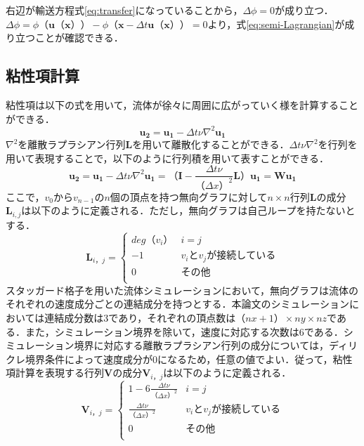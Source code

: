\documentclass[a4j,12pt]{jreport}
\begin{document}
 右辺が輸送方程式\ref{eq:transfer}になっていることから，$ \varDelta \phi =0$が成り立つ．
$\varDelta \phi = \phi（ \bm{u} （\bm{x}）） - \phi （\bm{x} - \varDelta t\bm{u} （\bm{x}））= 0$より，式\ref{eq:semi-Lagrangian}が成り立つことが確認できる．
\subsection{粘性項計算}
粘性項は以下の式を用いて，流体が徐々に周囲に広がっていく様を計算することができる．
\[
\bm{u_2}   =  \bm{u_1} - \varDelta t \nu\nabla^2\bm{u_1}
\]
$\nabla^2$を離散ラプラシアン行列$\mathbf{L}$を用いて離散化することができる．$\varDelta t \nu\nabla^2$を行列を用いて表現することで，以下のように行列積を用いて表すことができる．
\begin{equation}\label{eq:discrete Laplacian}
	\bm{u_2}   =  \bm{u_1} - \varDelta t \nu\nabla^2\bm{u_1} = （\mathbf{I} -  \frac{\varDelta t \nu}{（\varDelta x）^2}\mathbf{L}）\bm{u_1} = \mathbf{W}\bm{u_1}
\end{equation}
ここで，$v_0$から$v_{n-1}$の$n$個の頂点を持つ無向グラフに対して$n \times n$行列$\mathbf{L}$の成分$\mathbf{L}_{i,j}$は以下のように定義される．ただし，無向グラフは自己ループを持たないとする．
\[
	\mathbf{L}_{i，j} = \begin{cases}
 	deg（v_i） 	& i = j\\
 	-1  		& v_iとv_jが接続している\\
 	0  		& その他\\
 \end{cases}
\]
スタッガード格子を用いた流体シミュレーションにおいて，無向グラフは流体のそれぞれの速度成分ごとの連結成分を持つとする．本論文のシミュレーションにおいては連結成分数は3であり，それぞれの頂点数は$（nx+1） \times ny \times nz$である．また，シミュレーション境界を除いて，速度に対応する次数は$6$である．シミュレーション境界に対応する離散ラプラシアン行列の成分については，ディリクレ境界条件によって速度成分が$0$になるため，任意の値でよい．従って，粘性項計算を表現する行列$\mathbf{V}$の成分$\mathbf{V}_{i，j}$は以下のように定義される．
 \[
 	\mathbf{V}_{i，j}  = \begin{cases}
 	1 - 6 \frac{\varDelta t \nu}{（\varDelta x）^2} 	& i = j\\
 	 \frac{\varDelta t \nu}{（\varDelta x）^2}  	& v_iとv_jが接続している\\
 	0  				& その他\\
	 \end{cases}
\]
\end{document}
